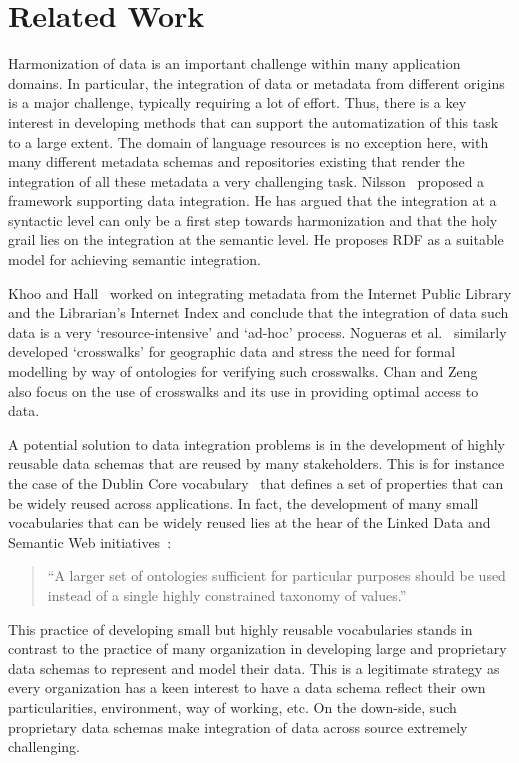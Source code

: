 \documentclass[smallextended]{svjour3}       %
\begin{document}
\section{Related Work}
\label{related-work}

Harmonization of data is an important challenge within many application domains. 
In particular, the integration of data or metadata from different origins is a
major challenge, typically requiring a lot of effort. 
Thus, there is a key interest in developing methods that can support the
automatization of this task to a large extent. 
The domain of language resources is no exception here, with many different
metadata schemas and repositories existing that render the integration of all
these metadata a very challenging task. 
Nilsson~\cite{nilsson2010interoperability} proposed a framework supporting data
integration. He has argued that the integration at a syntactic level can only be
a first step towards harmonization and that the holy grail lies on the
integration at the semantic level. He proposes RDF as a suitable model for
achieving semantic integration. 

Khoo and Hall~\cite{khoo2010merging} worked on integrating metadata from the
Internet Public Library and the Librarian’s Internet Index and conclude that the
integration of data such data is a very `resource-intensive’ and `ad-hoc’
process. 
Nogueras et al.~\cite{nogueras2004metadata} similarly developed `crosswalks' for
geographic data and stress the need for formal modelling by way of ontologies for
verifying such crosswalks. Chan and Zeng~\cite{chan2006metadata} also focus
on the use of crosswalks and its use in providing optimal access to data. 

A potential solution to data integration problems is in the development of
highly reusable data schemas that are reused by many stakeholders.  
This is for instance the case of the Dublin Core
vocabulary~\cite{weibel1998dublin} that defines a set of properties that can be
widely reused across applications. In fact, the development of many small
vocabularies that can be widely reused lies at the hear of the Linked Data and
Semantic Web initiatives~\cite{brooks2006towards}: 

\begin{quote}
``A larger set of ontologies sufficient for particular purposes should
be used instead of a single highly constrained taxonomy of values.''
\end{quote}

This practice of developing small but highly reusable vocabularies stands in
contrast to the practice of many organization in developing large and
proprietary data schemas to represent and model their data. This is a legitimate
strategy as every organization has a keen interest to have a data schema reflect
their own particularities, environment, way of working, etc. On the down-side,
such proprietary data schemas make integration of data across source extremely
challenging. 
\end{document}

